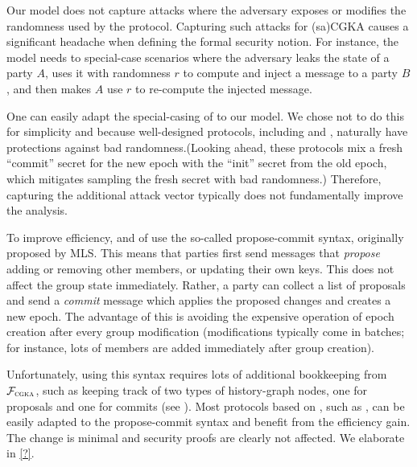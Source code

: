 \begin{description}[itemsep=0pt]
	\item [No randomness corruptions]
	Our model does not capture attacks where the adversary exposes or modifies the randomness used by the protocol.
	Capturing such attacks for (sa)CGKA causes a significant headache when defining the formal security notion. For instance, the model needs to special-case scenarios where the adversary leaks the state of a party $A$, uses it with randomness $r$ to compute and inject a message to a party $B$, and then makes $A$ use $r$ to re-compute the injected message.
	
	One can easily adapt the special-casing of \cite{TCC:ACJM20,EPRINT:AlwJosMul20,hashimoto2021cmpke} to our model. We chose not to do this for simplicity and because well-designed protocols, including \protITK and \saik, naturally have protections against bad randomness.(Looking ahead, these protocols mix a fresh ``commit'' secret for the new epoch with the ``init'' secret from the old epoch, which mitigates sampling the fresh secret with bad randomness.) Therefore, capturing the additional attack vector typically does not fundamentally improve the analysis.
	
	
	\item [Simplified syntax]
	To improve efficiency, \protITK and \protCMPKE of \cite{hashimoto2021cmpke} use the so-called propose-commit syntax, originally proposed by MLS. This means that parties first send messages that \emph{propose} adding or removing other members, or updating their own keys. This does not affect the group state immediately. Rather, a party can collect a list of proposals and send a \emph{commit} message which applies the proposed changes and creates a new epoch.
	The advantage of this is avoiding the expensive operation of epoch creation after every group modification (modifications typically come in batches; for instance, lots of members are added immediately after group creation).
	
	Unfortunately, using this syntax requires lots of additional bookkeeping from $\mathcal{F}_{\normalfont\textsc{cgka}}$, such as keeping track of two types of history-graph nodes, one for proposals and one for commits (see  \cite{EPRINT:AlwJosMul20,hashimoto2021cmpke}). Most protocols based on \protITK, such as \saik, can be easily adapted to the propose-commit syntax and benefit from the efficiency gain. The change is minimal and security proofs are clearly not affected. We elaborate in \cref{?}.
	


\end{description}
